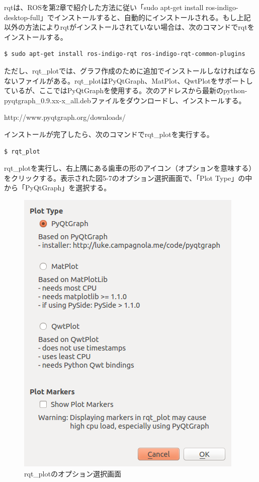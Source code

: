 rqtは、ROSを第2章で紹介した方法に従い「sudo apt-get install ros-indigo-desktop-full」でインストールすると、自動的にインストールされる。もし上記以外の方法によりrqtがインストールされていない場合は、次のコマンドでrqtをインストールする。

\vspace{\baselineskip}
\begin{lstlisting}[language=ROS]
$ sudo apt-get install ros-indigo-rqt ros-indigo-rqt-common-plugins
\end{lstlisting}

ただし、rqt\_plotでは、グラフ作成のために追加でインストールしなければならないファイルがある。rqt\_plotはPyQtGraph、MatPlot、QwtPlotをサポートしているが、ここではPyQtGraphを使用する。次のアドレスから最新のpython-pyqtgraph\_0.9.xx-x\_all.debファイルをダウンロードし、インストールする。

http://www.pyqtgraph.org/downloads/

インストールが完了したら、次のコマンドでrqt\_plotを実行する。

\vspace{\baselineskip}
\begin{lstlisting}[language=ROS]
$ rqt_plot
\end{lstlisting}

rqt\_plotを実行し、右上隅にある歯車の形のアイコン（オプションを意味する）をクリックする。表示された図5-7のオプション選択画面で、「Plot Type」の中から「PyQtGraph」を選択する。

\begin{figure}[htp]
  \centering
  \includegraphics[width=\columnwidth]{pictures/chapter5/pic_05_07.png}
  \caption{rqt\_plotのオプション選択画面}
\end{figure}

